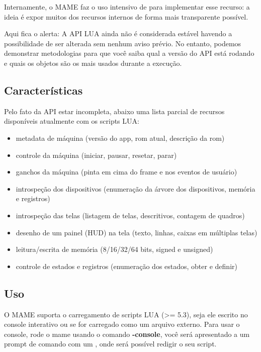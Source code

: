 \documentclass[letterpaper,10pt,brazil]{sphinxmanual}
\begin{document}
Internamente, o MAME faz o uso intensivo de  para
implementar esse recurso: a ideia é expor muitos dos recursos internos
de forma mais transparente possível.

Aqui fica o alerta: A API LUA ainda não é considerada estável havendo a
possibilidade de ser alterada sem nenhum aviso prévio. No entanto,
podemos demonstrar metodologias para que você saiba qual a versão do
API está rodando e quais os objetos são os mais usados durante a
execução.


\subsection{Características}
\label{techspecs/luaengine:caracteristicas}
Pelo fato da API estar incompleta, abaixo uma lista parcial de recursos
disponíveis atualmente com os scripts LUA:
\begin{itemize}
\item {} 
metadata de máquina (versão do app, rom atual, descrição da rom)

\item {} 
controle da máquina (iniciar, pausar, resetar, parar)

\item {} 
ganchos da máquina (pinta em cima do frame e nos eventos de usuário)

\item {} 
introspeção dos dispositivos (enumeração da árvore dos dispositivos, memória e registros)

\item {} 
introspeção das telas (listagem de telas, descritivos, contagem de quadros)

\item {} 
desenho de um painel (HUD) na tela (texto, linhas, caixas em múltiplas telas)

\item {} 
leitura/escrita de memória (8/16/32/64 bits, signed e unsigned)

\item {} 
controle de estados e registros (enumeração dos estados, obter e definir)

\end{itemize}


\subsection{Uso}
\label{techspecs/luaengine:uso}
O MAME suporta o carregamento de scripts LUA (\textgreater{}= 5.3), seja ele escrito
no console interativo ou se for carregado como um arquivo externo. Para
usar o console, rode o mame usando o comando \textbf{-console}, você será
apresentado a um prompt de comando com um \sphinxcode{\textgreater{}}, onde será possível
redigir o seu script.
\end{document}

